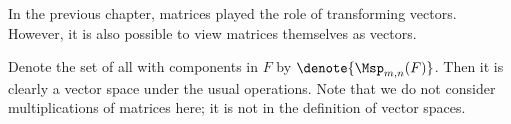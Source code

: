 \begin{example}
    \label{exm:vspmat}
    In the previous chapter,
    matrices played the role of transforming vectors.
    However, it is also possible to view matrices themselves as vectors.

    Denote the set of all  with components in \(F\)
    by \(\denote{\Msp_{m,n}(F)}\).
    Then it is clearly a vector space under the usual operations.
    Note that we do not consider multiplications of matrices here;
    it is not in the definition of vector spaces.
\end{example}